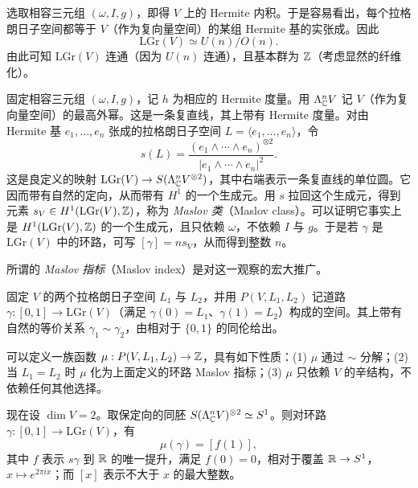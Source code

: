 选取相容三元组 $(\omega,I,g)$，即得 $V$ 上的 Hermite 内积。于是容易看出，每个拉格朗日子空间都等于 $V$（作为复向量空间）的某组 Hermite 基的实张成。因此
\[
  \mathrm{LGr}(V) \simeq U(n)/O(n).
\]
由此可知 $\mathrm{LGr}(V)$ 连通（因为 $U(n)$ 连通），且基本群为 $\mathbb{Z}$（考虑显然的纤维化）。


固定相容三元组 $(\omega,I,g)$，记 $h$ 为相应的 Hermite 度量。用 $\Lambda^n_{\mathbb{C}}V$ 记 $V$（作为复向量空间）的最高外幂。这是一条复直线，其上带有 Hermite 度量。对由 Hermite 基 $e_1,\dots,e_n$ 张成的拉格朗日子空间 $L=\langle e_1,\dots,e_n\rangle$，令
\[
  s(L) = \frac{(e_1\wedge\cdots\wedge e_n)^{\otimes 2}}
               {|e_1\wedge\cdots\wedge e_n|^2} .
\]
这是良定义的映射 $\mathrm{LGr}(V)\to S(\Lambda^n_{\mathbb{C}}V^{\otimes 2})$，其中右端表示一条复直线的单位圆。它因而带有自然的定向，从而带有 $H^1$ 的一个生成元。用 $s$ 拉回这个生成元，得到元素 $s_V\in H^1(\mathrm{LGr}(V),\mathbb{Z})$，称为 \emph{Maslov 类}（Maslov class）。可以证明它事实上是 $H^1(\mathrm{LGr}(V),\mathbb{Z})$ 的一个生成元，且只依赖 $\omega$，不依赖 $I$ 与 $g$。于是若 $\gamma$ 是 $\mathrm{LGr}(V)$ 中的环路，可写 $[\gamma]=n s_V$，从而得到整数 $n$。


所谓的 \emph{Maslov 指标}（Maslov index）是对这一观察的宏大推广。

\begin{theorem}\label{thm:4.1}
固定 $V$ 的两个拉格朗日子空间 $L_1$ 与 $L_2$，并用 $P(V,L_1,L_2)$ 记道路 $\gamma:[0,1]\to\mathrm{LGr}(V)$（满足 $\gamma(0)=L_1$、$\gamma(1)=L_2$）构成的空间。其上带有自然的等价关系 $\gamma_1\sim\gamma_2$，由相对于 $\{0,1\}$ 的同伦给出。

可以定义一族函数 $\mu: P(V,L_1,L_2)\to\mathbb{Z}$，具有如下性质：(1) $\mu$ 通过 $\sim$ 分解；(2) 当 $L_1=L_2$ 时 $\mu$ 化为上面定义的环路 Maslov 指标；(3) $\mu$ 只依赖 $V$ 的辛结构，不依赖任何其他选择。

现在设 $\dim V=2$。取保定向的同胚 $S(\Lambda^n_{\mathbb{C}}V)^{\otimes 2}\simeq S^1$。则对环路 $\gamma:[0,1]\to\mathrm{LGr}(V)$，有
\[
  \mu(\gamma) = [f(1)],
\]
其中 $f$ 表示 $s\gamma$ 到 $\mathbb{R}$ 的唯一提升，满足 $f(0)=0$，相对于覆盖 $\mathbb{R}\to S^1$，$x\mapsto e^{2\pi i x}$；而 $[x]$ 表示不大于 $x$ 的最大整数。
\end{theorem}

